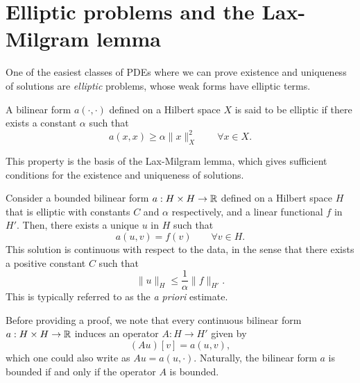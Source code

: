 \section{Elliptic problems and the Lax-Milgram lemma}
One of the easiest classes of PDEs where we can prove existence and uniqueness of solutions are \emph{elliptic} problems, whose weak forms have elliptic terms.
\begin{definition}\label{def:elliptic-form}
A bilinear form $a(\cdot, \cdot)$ defined on a Hilbert space $X$ is said to be elliptic if there exists a constant $\alpha$ such that
\begin{equation}\label{eq:elliptic-form}
    a(x, x) \geq \alpha \| x \|^2_X \qquad \forall x\in X.
\end{equation}
\end{definition}
This property is the basis of the Lax-Milgram lemma, which gives sufficient conditions for the existence and uniqueness of solutions. 
\begin{lemma}\label{lemma:lax-milgram}
    Consider a bounded bilinear form $a: H\times H\to \mathbb{R}$ defined on a Hilbert space $H$ that is elliptic with constants $C$ and $\alpha$ respectively, and a linear functional $f$ in $H'$. Then, there exists a unique $u$ in $H$ such that 
    \begin{equation}\label{eq:lax-milgram-form}
        a(u, v) = f(v) \qquad \forall v \in H.
    \end{equation}
    This solution is continuous with respect to the data, in the sense that there exists a positive constant $C$ such that 
    \begin{equation}\label{eq:lax-milgram-a-priori}
        \| u\|_H \leq \frac 1 \alpha \| f \|_{H'} .
    \end{equation}
    This is typically referred to as the \emph{a priori} estimate. 
\end{lemma}

Before providing a proof, we note that every continuous bilinear form $a:H\times H\to \mathbb{R}$ induces an operator $A:H\to H'$ given by
\begin{equation}\label{eq:form-induced-by-matrix}
    (Au)[v] = a(u,v),
\end{equation}
which one could also write as $Au = a(u, \cdot)$. Naturally, the bilinear form $a$ is bounded if and only if the operator $A$ is bounded. 

